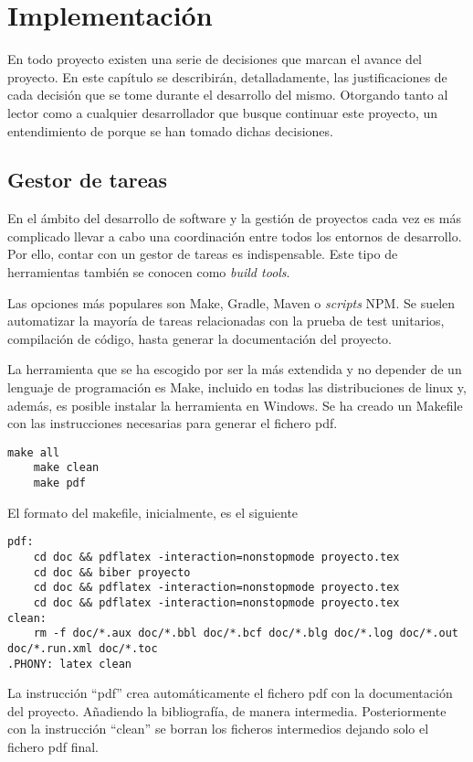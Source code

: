 \chapter{Implementación}
En todo proyecto existen una serie de decisiones que marcan el avance del proyecto. En este capítulo se describirán, detalladamente, las justificaciones de cada decisión que se tome durante el desarrollo del mismo. Otorgando tanto al lector como a cualquier desarrollador que busque continuar este proyecto, un entendimiento de porque se han tomado dichas decisiones.

\section{Gestor de tareas}
En el ámbito del desarrollo de software y la gestión de proyectos cada vez es más complicado llevar a cabo una coordinación entre todos los entornos de desarrollo. Por ello, contar con un gestor de tareas es indispensable. Este tipo de herramientas también se conocen como \textit{build tools}. 

Las opciones más populares son Make, Gradle, Maven o \textit{scripts} NPM. Se suelen automatizar la mayoría de tareas relacionadas con la prueba de test unitarios, compilación de código, hasta generar la documentación del proyecto. 

La herramienta que se ha escogido por ser la más extendida y no depender de un lenguaje de programación es Make, incluido en todas las distribuciones de linux y, además, es posible instalar la herramienta en Windows. Se ha creado un Makefile con las instrucciones necesarias para generar el fichero pdf.

\begin{lstlisting}[style=consola]
    make all
    make clean
    make pdf
\end{lstlisting}
\newpage
El formato del makefile, inicialmente, es el siguiente
\begin{lstlisting}[style=consola]
pdf:
	cd doc && pdflatex -interaction=nonstopmode proyecto.tex
	cd doc && biber proyecto
	cd doc && pdflatex -interaction=nonstopmode proyecto.tex
	cd doc && pdflatex -interaction=nonstopmode proyecto.tex
clean:
	rm -f doc/*.aux doc/*.bbl doc/*.bcf doc/*.blg doc/*.log doc/*.out doc/*.run.xml doc/*.toc
.PHONY: latex clean
\end{lstlisting}

La instrucción ``pdf'' crea automáticamente el fichero pdf con la documentación del proyecto. Añadiendo la bibliografía, de manera intermedia. Posteriormente con la instrucción ``clean'' se borran los ficheros intermedios dejando solo el fichero pdf final. 